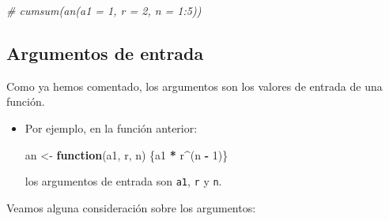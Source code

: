 \documentclass[]{book}
\newenvironment{Shaded}{\begin{snugshade}}{\end{snugshade}}
\newcommand{\DecValTok}[1]{\textcolor[rgb]{0.00,0.00,0.81}{#1}}
\newcommand{\StringTok}[1]{\textcolor[rgb]{0.31,0.60,0.02}{#1}}
\newcommand{\CommentTok}[1]{\textcolor[rgb]{0.56,0.35,0.01}{\textit{#1}}}
\newcommand{\ControlFlowTok}[1]{\textcolor[rgb]{0.13,0.29,0.53}{\textbf{#1}}}
\newcommand{\OperatorTok}[1]{\textcolor[rgb]{0.81,0.36,0.00}{\textbf{#1}}}
\newcommand{\NormalTok}[1]{#1}
\begin{document}
\begin{Shaded}
\begin{Highlighting}[]
\CommentTok{# cumsum(an(a1 = 1, r = 2, n = 1:5))}
\end{Highlighting}
\end{Shaded}

\subsection{Argumentos de entrada}\label{argumentos-de-entrada}

Como ya hemos comentado, los argumentos son los valores de entrada de
una función.

\begin{itemize}
\item
  Por ejemplo, en la función anterior:

\begin{Shaded}
\begin{Highlighting}[]
\NormalTok{an <-}\StringTok{ }\ControlFlowTok{function}\NormalTok{(a1, r, n) \{a1 }\OperatorTok{*}\StringTok{ }\NormalTok{r}\OperatorTok{^}\NormalTok{(n }\OperatorTok{-}\StringTok{ }\DecValTok{1}\NormalTok{)\}}
\end{Highlighting}
\end{Shaded}

  los argumentos de entrada son \texttt{a1}, \texttt{r} y \texttt{n}.
\end{itemize}

Veamos alguna consideración sobre los argumentos:
\end{document}
